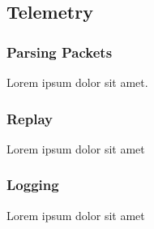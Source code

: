 \subsectionfont{\fontsize{14}{14}\selectfont}

\subsection{Telemetry}

\subsubsection{Parsing Packets}
Lorem ipsum dolor sit amet.
\subsubsection{Replay}
Lorem ipsum dolor sit amet
\subsubsection{Logging}
Lorem ipsum dolor sit amet
